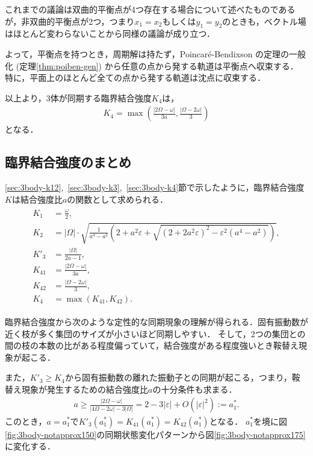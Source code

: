 \documentclass[../main]{subfiles}
\begin{document}
    これまでの議論は双曲的平衡点が4つ存在する場合について述べたものであるが，非双曲的平衡点が2つ，つまり$x_1=x_2$もしくは$y_1=y_2$のときも，ベクトル場はほとんど変わらないことから同様の議論が成り立つ．

    よって，平衡点を持つとき，周期解は持たず，Poincar\'{e}-Bendixson の定理の一般化 (定理\ref{thm:poiben-gen}) から任意の点から発する軌道は平衡点へ収束する．
    特に，平面上のほとんど全ての点から発する軌道は沈点に収束する．

    以上より，3体が同期する臨界結合強度$K_4$は，
    \begin{align}
        \label{eq:K4-approx}
        K_4=\max\left(\frac{|2\Omega-\omega|}{3a},\frac{|\Omega-2\omega|}{3}\right)
    \end{align}
    となる．
    
    \subsection{臨界結合強度のまとめ}
    \label{sec:3body-summary}
    \ref{sec:3body-k12},\ \ref{sec:3body-k3},\ \ref{sec:3body-k4}節で示したように，臨界結合強度$K$は結合強度比$a$の関数として求められる．
    \begin{align}
        \label{eq:3body-matome}
        \begin{split}
            K_1&=\frac{\omega}{2},\\
            K_2&=|\Omega|\cdot\sqrt{\frac{1}{a^4-a^2}\left(2+a^2\varepsilon+\sqrt{(2+2a^2\varepsilon)^2-\varepsilon^2(a^4-a^2)}\right)},\\
            K'_3&=\frac{|\Omega|}{2a-1},\\
            K_{41}&=\frac{|2\Omega-\omega|}{3a},\\
            K_{42}&=\frac{|\Omega-2\omega|}{3},\\
            K_4&=\max\left(K_{41},K_{42}\right).
        \end{split}
    \end{align}

    臨界結合強度から次のような定性的な同期現象の理解が得られる．固有振動数が近く枝が多く集団のサイズが小さいほど同期しやすい．
    そして，2つの集団との間の枝の本数の比がある程度偏っていて，結合強度がある程度強いとき鞍替え現象が起こる．
    
    また，$K'_3\geq K_4$から固有振動数の離れた振動子との同期が起こる，つまり，鞍替え現象が発生するための結合強度比$a$の十分条件も求まる．
    \begin{align}
        \label{eq:a-ast1}
        a\geq \frac{|2\Omega-\omega|}{|4\Omega-2\omega|-3|\Omega|}= 2-3|\varepsilon|+O(|\varepsilon|^2):=a^\ast_1.    
    \end{align}
    このとき，$a=a^\ast_1$で$K'_{3}(a^\ast_1)=K_{41}(a^\ast_1)=K_{42}(a^\ast_1)$となる．
    $a^\ast_1$を境に図\ref{fig:3body-notapprox150}の同期状態変化パターンから図\ref{fig:3body-notapprox175}に変化する．
\end{document}
